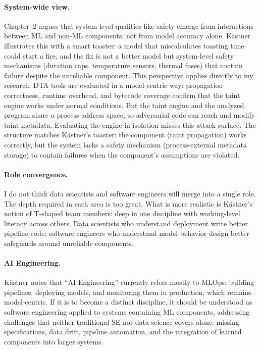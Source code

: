 \documentclass[a4paper,11pt]{article}
\theoremstyle{plain}
\begin{document}
\paragraph{System-wide view.}
Chapter~2 argues that system-level qualities like safety emerge from interactions between ML and non-ML components, not from model accuracy alone. Kästner illustrates this with a smart toaster: a model that miscalculates toasting time could start a fire, and the fix is not a better model but system-level safety mechanisms (duration caps, temperature sensors, thermal fuses) that contain failure despite the unreliable component. This perspective applies directly to my research. DTA tools are evaluated in a model-centric way: propagation correctness, runtime overhead, and bytecode coverage confirm that the taint engine works under normal conditions. But the taint engine and the analyzed program share a process address space, so adversarial code can reach and modify taint metadata. Evaluating the engine in isolation misses this attack surface. The structure matches Kästner's toaster: the component (taint propagation) works correctly, but the system lacks a safety mechanism (process-external metadata storage) to contain failures when the component's assumptions are violated.

\paragraph{Role convergence.}
I do not think data scientists and software engineers will merge into a single role. The depth required in each area is too great. What is more realistic is Kästner's notion of T-shaped team members: deep in one discipline with working-level literacy across others. Data scientists who understand deployment write better pipeline code; software engineers who understand model behavior design better safeguards around unreliable components.

\paragraph{AI Engineering.}
Kästner notes that ``AI Engineering'' currently refers mostly to MLOps: building pipelines, deploying models, and monitoring them in production, which remains model-centric. If it is to become a distinct discipline, it should be understood as software engineering applied to systems containing ML components, addressing challenges that neither traditional SE nor data science covers alone: missing specifications, data drift, pipeline automation, and the integration of learned components into larger systems.
\end{document}
